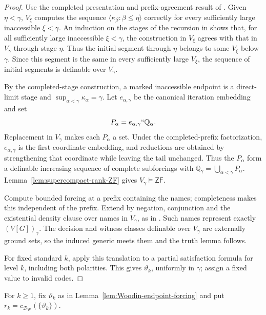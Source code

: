 \documentclass[11pt,a4paper]{amsart}
\newcommand{\ZF}{\mathsf{ZF}}
\theoremstyle{plain}
\theoremstyle{definition}
\theoremstyle{remark}
\begin{document}
\begin{proof}
\begingroup

{\color{auditgreen}Use the completed presentation and prefix-agreement result of \cite[Woodin supplement]{RepairNotes}.}  Given $\eta<\gamma$, $V_\xi$ computes the sequence $\langle\kappa_\beta:\beta\leq\eta\rangle$ correctly for every sufficiently large inaccessible $\xi<\gamma$.  An induction on the stages of the recursion in \cite[Definition~43]{Spoerl} shows that, for all sufficiently large inaccessible $\xi<\gamma$, the construction in $V_\xi$ agrees with that in $V_\gamma$ through stage $\eta$.  Thus the initial segment through $\eta$ belongs to some $V_\xi$ below $\gamma$.  Since this segment is the same in every sufficiently large $V_\xi$, the sequence of initial segments is definable over $V_\gamma$.

{\color{auditgreen}By the completed-stage construction, a marked inaccessible endpoint is a direct-limit stage and $\sup_{\alpha<\gamma}\kappa_\alpha=\gamma$.}  {\color{auditgreen}Let $e_{\alpha,\gamma}$ be the canonical iteration embedding and set
\[
P_\alpha=e_{\alpha,\gamma}``\mathbb Q_\alpha.
\]}
Replacement in $V_\gamma$ makes each $P_\alpha$ a set.  {\color{auditgreen}Under the completed-prefix factorization, $e_{\alpha,\gamma}$} is the first-coordinate embedding, and reductions are obtained by strengthening that coordinate while leaving the tail unchanged.  Thus the $P_\alpha$ form a definable increasing sequence of complete subforcings with
$\mathbb Q_\gamma=\bigcup_{\alpha<\gamma}P_\alpha$.  Lemma~\ref{lem:supercompact-rank-ZF} gives $V_\gamma\models\ZF$.  {\color{auditgreen}Compute bounded forcing at a prefix containing the names; completeness makes this independent of the prefix.  Extend by negation, conjunction and the existential density clause over names in $V_\gamma$, as in \cite[Woodin supplement, low-name truth]{RepairNotes}.  Such names represent exactly $(V[G])_\gamma$.  The decision and witness classes definable over $V_\gamma$ are externally ground sets, so the induced generic meets them and the truth lemma follows.

For fixed standard $k$, apply this translation to a partial satisfaction formula for level $k$, including both polarities.  This gives $\vartheta_k$, uniformly in $\gamma$; assign a fixed value to invalid codes.}
\endgroup
\end{proof}

{For $k\geq1$, fix $\vartheta_k$ as in Lemma~\ref{lem:Woodin-endpoint-forcing} and put $r_k=c_{\mathcal D_{\mathrm W}}(\{\vartheta_k\})$.}
\end{document}
